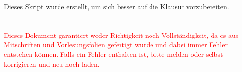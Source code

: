 Dieses Skript wurde erstellt, um sich besser auf die Klausur vorzubereiten.\\
\qquad\\
\qquad\\
\textcolor{red}{\Large{Dieses Dokument garantiert weder Richtigkeit noch Vollständigkeit, da es aus Mitschriften und Vorlesungsfolien gefertigt wurde und dabei immer Fehler entstehen können. Falls ein Fehler enthalten ist, bitte melden oder selbst korrigieren und neu hoch laden.}}


